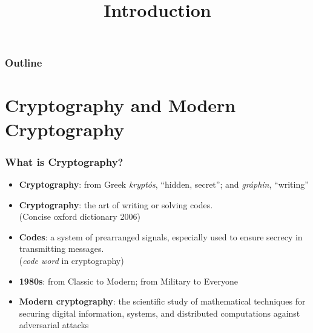 

\title{Introduction}


\maketitle
\begin{frame}
\frametitle{Outline}
\tableofcontents
\end{frame}
\section{Cryptography and Modern Cryptography}
\begin{frame}\frametitle{What is Cryptography?}
\begin{itemize}
\item \textbf{Cryptography}: from Greek \emph{krypt\'os}, ``hidden, secret''; and \emph{gr\'{a}phin}, ``writing''
\item \textbf{Cryptography}: the art of writing or solving codes.\\ (Concise oxford dictionary 2006)
\item \textbf{Codes}: a system of prearranged signals, especially used to ensure secrecy in transmitting messages. \\ (\emph{code word} in cryptography)
\item \textbf{1980s}: from Classic to Modern; from Military to Everyone
\item \textbf{Modern cryptography}: the scientific study of mathematical techniques for securing digital information, systems, and distributed computations against adversarial attacks
\end{itemize}
\end{frame}
